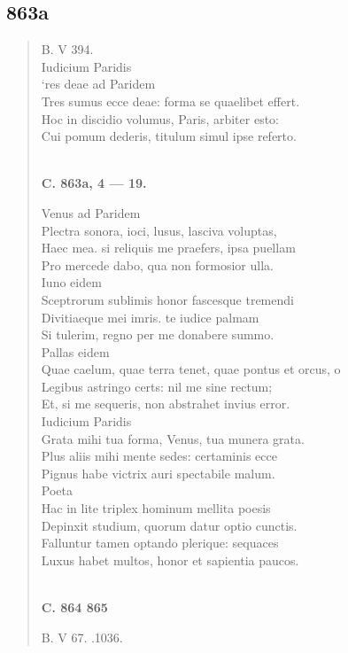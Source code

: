 \documentclass[11pt, a4paper]{report}
\begin{document}
            \subsection*{863a}
      \begin{verse}
      B. V 394. \\  \lbrack Iudicium Paridis \rbrack  \\ ‘res deae ad Paridem \\ Tres sumus  \lbrack ecce \rbrack  deae: forma se quaelibet effert. \\ Hoc in discidio volumus, Paris, arbiter esto: \\ Cui pomum dederis, titulum simul ipse referto. \\ 
        ﻿\pagebreak 
    \begin{center} \textbf{C. 863a, 4 — 19.} \end{center} \marginpar{[314]} Venus ad Paridem \\ Plectra sonora, ioci, lusus, lasciva voluptas, \\ Haec mea. si reliquis me praefers, ipsa puellam \\ Pro mercede dabo, qua non formosior ulla. \\ Iuno eidem \\ Sceptrorum sublimis honor fascesque tremendi \\ Divitiaeque mei imris. te iudice palmam \\ Si tulerim, regno per me donabere summo. \\ Pallas eidem \\ Quae caelum, quae terra tenet, quae pontus et orcus, o \\ Legibus astringo certs: nil me sine rectum; \\ Et, si me sequeris, non abstrahet invius error. \\ Iudicium Paridis \\ Grata mihi tua forma, Venus, tua munera grata. \\ Plus aliis mihi mente sedes: certaminis ecce \\ Pignus habe victrix auri spectabile malum. \\ Poeta \\ Hac in lite triplex hominum mellita poesis \\ Depinxit studium, quorum datur optio cunctis. \\ Falluntur tamen optando plerique: sequaces \\ Luxus habet multos, honor et sapientia paucos. \\ 
        ﻿\pagebreak 
    \begin{center} \textbf{C. 864 865} \end{center} \marginpar{[315]} B. V 67. .1036. \\ 
      \end{verse}
  
\end{document}
